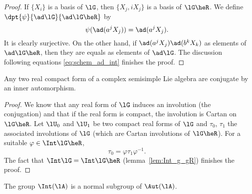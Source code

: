 \begin{proof}
	If $\{X_i\}$ is a basis of $\lG$, then $\{X_j,iX_j\}$ is a basis of $\lG\heR$. We define $\dpt{\psi}{\ad\lG}{\ad\lG\heR}$ by
	\[
		\psi(\ad(a^jX_j))=\ad(a^jX_j).
	\]
	It is clearly surjective. On the other hand, if $\ad(a^jX_j)\ad(b^kX_k)$ as elements of $\ad\lG\heR$, then they are equals as elements of $\ad\lG$. The discussion following equations \eqref{eq:schem_ad_int} finishes the proof.
\end{proof}

\begin{corollary}
	Any two real compact form of a complex semisimple Lie algebra are conjugate by an inner automorphism.
\end{corollary}

\begin{proof}
	We know that any real form of $\lG$ induces an involution (the conjugation) and that if the real form is compact, the involution is Cartan on $\lG\heR$. Let $\lU_0$ and $\lU_1$ be two compact real forms of $\lG$ and $\tau_0$, $\tau_1$ the associated involutions of $\lG$ (which are Cartan involutions of $\lG\heR$). For a suitable $\varphi\in\Int\lG\heR$,
	\[
		\tau_0=\varphi\tau_1\varphi^{-1}.
	\]
	The fact that $\Int\lG=\Int\lG\heR$ (lemma~\ref{lem:Int_g_gR}) finishes the proof.
\end{proof}

\begin{proposition}
	The group $\Int(\lA)$ is a normal subgroup of $\Aut(\lA)$.
\end{proposition}

